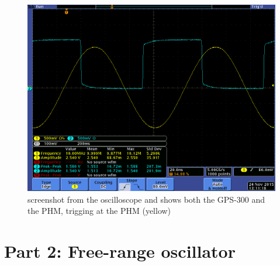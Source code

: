 \documentclass[11pt,english,a4paper]{article}
\begin{document}
\begin{figure}[!htb]
  \centering
    \includegraphics[width=1\textwidth]{tek00006.png}
      \caption{screenshot from the oscilloscope and shows both the GPS-300 and the PHM, trigging at the PHM (yellow)}
          \label{fig:tek00006.png}
\end{figure}

\section{Part 2: Free-range oscillator}
\end{document}
